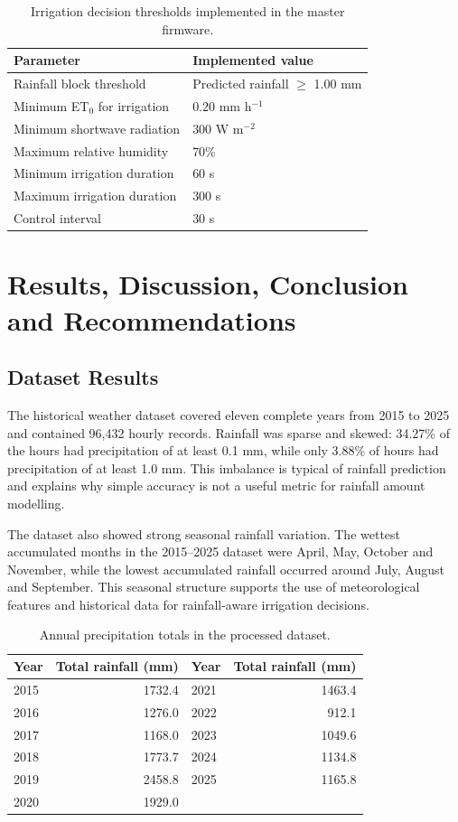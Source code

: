\documentclass[12pt,a4paper]{report}
\begin{document}
\begin{table}[H]
	\centering
	\caption{Irrigation decision thresholds implemented in the master firmware.}
	\label{tab:thresholds}
	\begin{tabular}{ll}
		\toprule
		Parameter & Implemented value\\
		\midrule
		Rainfall block threshold & Predicted rainfall $\geq$ 1.00 mm\\
		Minimum ET$_0$ for irrigation & 0.20 mm h$^{-1}$\\
		Minimum shortwave radiation & 300 W m$^{-2}$\\
		Maximum relative humidity & 70\%\\
		Minimum irrigation duration & 60 s\\
		Maximum irrigation duration & 300 s\\
		Control interval & 30 s\\
		\bottomrule
	\end{tabular}
\end{table}

\chapter{Results, Discussion, Conclusion and Recommendations}

\section{Dataset Results}
The historical weather dataset covered eleven complete years from 2015 to 2025 and contained 96,432 hourly records. Rainfall was sparse and skewed: 34.27\% of the hours had precipitation of at least 0.1 mm, while only 3.88\% of hours had precipitation of at least 1.0 mm. This imbalance is typical of rainfall prediction and explains why simple accuracy is not a useful metric for rainfall amount modelling.

The dataset also showed strong seasonal rainfall variation. The wettest accumulated months in the 2015--2025 dataset were April, May, October and November, while the lowest accumulated rainfall occurred around July, August and September. This seasonal structure supports the use of meteorological features and historical data for rainfall-aware irrigation decisions.

\begin{table}[H]
	\centering
	\caption{Annual precipitation totals in the processed dataset.}
	\label{tab:annual_precip}
	\begin{tabular}{lr@{\hspace{1cm}}lr}
		\toprule
		Year & Total rainfall (mm) & Year & Total rainfall (mm)\\
		\midrule
		2015 & 1732.4 & 2021 & 1463.4\\
		2016 & 1276.0 & 2022 & 912.1\\
		2017 & 1168.0 & 2023 & 1049.6\\
		2018 & 1773.7 & 2024 & 1134.8\\
		2019 & 2458.8 & 2025 & 1165.8\\
		2020 & 1929.0 & &\\
		\bottomrule
	\end{tabular}
\end{table}
\end{document}
